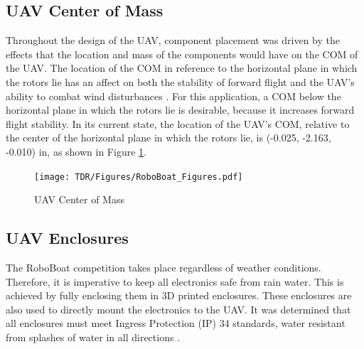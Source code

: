 \documentclass[letterpaper, 12 pt, conference]{ieeeconf}
\begin{document}
%
\subsection{UAV Center of Mass}
% 
Throughout the design of the UAV, component placement was driven by the effects that the location and mass of the components would have on the COM of the UAV. The location of the COM in reference to the horizontal plane in which the rotors lie has an affect on both the stability of forward flight and the UAV's ability to combat wind disturbances \cite{compaper}. For this application, a COM below the horizontal plane in which the rotors lie is desirable, because it increases forward flight stability. In its current state, the location of the UAV's COM, relative to the center of the horizontal plane in which the rotors lie, is (-0.025, -2.163, -0.010) in, as shown in Figure \ref{fig:com}. 
%
\begin{figure}[tb]
\vspace{0.05in}
\centering
\texttt{[image: TDR/Figures/RoboBoat\_Figures.pdf]}
\caption{UAV Center of Mass}
\label{fig:com}
\end{figure}
\subsection{UAV Enclosures}
% 
The RoboBoat competition takes place regardless of weather conditions. Therefore, it is imperative to keep all electronics safe from rain water. This is achieved by fully enclosing them in 3D printed enclosures. These enclosures are also used to directly mount the electronics to the UAV. It was determined that all enclosures must meet Ingress Protection (IP) 34 standards, water resistant from splashes of water in all directions \cite{IP}. 
\end{document}

